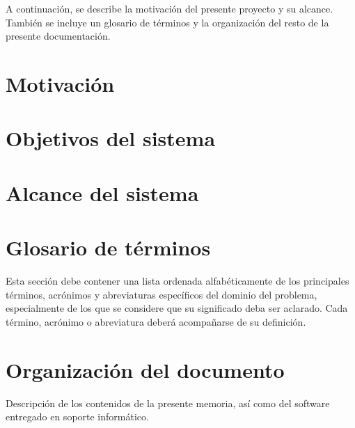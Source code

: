 

A continuación, se describe la motivación del presente proyecto y su alcance. También se incluye un glosario de términos y la organización del resto de la presente documentación.

\section{Motivación}
\label{sec:motivation}


\section{Objetivos del sistema}
\label{sec:objectives}


\section{Alcance del sistema}
\label{sec:scope}


\section{Glosario de términos} 
Esta sección debe contener una lista ordenada alfabéticamente de los principales términos, acrónimos y abreviaturas específicos del dominio del problema, especialmente de los que se considere que su significado deba ser aclarado. Cada término, acrónimo o abreviatura deberá acompañarse de su definición.

\section{Organización del documento}
Descripción de los contenidos de la presente memoria, así como del software entregado en soporte informático.